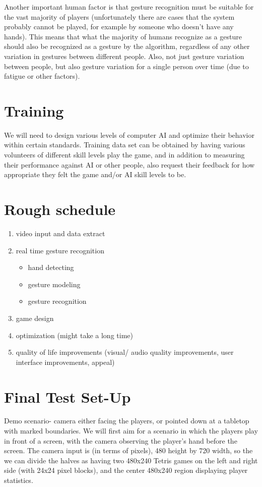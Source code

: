 \documentclass{article}
\begin{document}
	Another important human factor is that gesture recognition must be suitable for the vast majority of players (unfortunately there are cases that the system probably cannot be played, for example by someone who doesn’t have any hands). This means that what the majority of humans recognize as a gesture should also be recognized as a gesture by the algorithm, regardless of any other variation in gestures between different people. Also, not just gesture variation between people, but also gesture variation for a single person over time (due to fatigue or other factors).\\
	
	
	\section{Training}
	We will need to design various levels of computer AI and optimize their behavior within certain standards. Training data set can be obtained by having various volunteers of different skill levels play the game, and in addition to measuring their performance against AI or other people, also request their feedback for how appropriate they felt the game and/or AI skill levels to be.\\
	
	\section{Rough schedule}
	\renewcommand\labelenumi{(\theenumi)}
	\begin{enumerate}
		\item{video input and data extract}
		\item{real time gesture recognition}
		\begin{itemize}
			\item{hand detecting}
			\item{gesture modeling}
			\item{gesture recognition}
		\end{itemize}
		\item{game design}
		\item{optimization (might take a long time)}
		\item{quality of life improvements (visual/ audio quality improvements, user interface improvements, appeal)}
	\end{enumerate}
	
	\section{Final Test Set-Up} 
	Demo scenario- camera either facing the players, or pointed down at a tabletop with marked boundaries. We will first aim for a scenario in which the players play in front of a screen, with the camera observing the player’s hand before the screen. The camera input is (in terms of pixels), 480 height by 720 width, so the we can divide the halves as having two 480x240 Tetris games on the left and right side (with 24x24 pixel blocks), and the center 480x240 region displaying player statistics.\\
	
\end{document}
